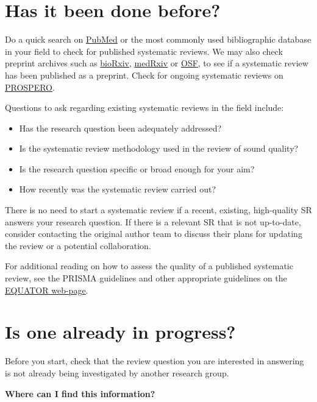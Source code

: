 \documentclass[
]{book}
\providecommand{\tightlist}{%
  \setlength{\itemsep}{0pt}\setlength{\parskip}{0pt}}
\begin{document}
\section{Has it been done before?}\label{has-it-been-done-before}

Do a quick search on \href{https://pubmed.ncbi.nlm.nih.gov/}{PubMed} or the most commonly used bibliographic database in your field to check for published systematic reviews. We may also check preprint archives such as \href{https://www.biorxiv.org/}{bioRxiv}, \href{https://www.medrxiv.org/}{medRxiv} or \href{https://osf.io/}{OSF}, to see if a systematic review has been published as a preprint. Check for ongoing systematic reviews on \href{https://www.crd.york.ac.uk/prospero/}{PROSPERO}.

Questions to ask regarding existing systematic reviews in the field include:

\begin{itemize}
\tightlist
\item
  Has the research question been adequately addressed?
\item
  Is the systematic review methodology used in the review of sound quality?
\item
  Is the research question specific or broad enough for your aim?
\item
  How recently was the systematic review carried out?
\end{itemize}

There is no need to start a systematic review if a recent, existing, high-quality SR answers your research question. If there is a relevant SR that is not up-to-date, consider contacting the original author team to discuss their plans for updating the review or a potential collaboration.

For additional reading on how to assess the quality of a published systematic review, see the PRISMA guidelines and other appropriate guidelines on the \href{https://www.equator-network.org/}{EQUATOR web-page}.

\section{Is one already in progress?}\label{is-one-already-in-progress}

Before you start, check that the review question you are interested in answering is not already being investigated by another research group.

\textbf{Where can I find this information?}
\end{document}
